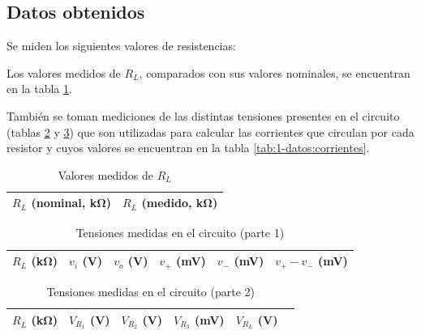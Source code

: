 \subsection{Datos obtenidos}

Se miden los siguientes valores de resistencias:

\begin{itemize}
        
\end{itemize}

Los valores medidos de $R_L$, comparados con sus valores nominales, se encuentran en la tabla \ref{tab:1-datos:resistencias-l}.

También se toman mediciones de las distintas tensiones presentes en el circuito (tablas \ref{tab:1-datos:tensiones-1} y \ref{tab:1-datos:tensiones-2}) que son utilizadas para calcular las corrientes que circulan por cada resistor y cuyos valores se encuentran en la tabla \ref{tab:1-datos:corrientes}.

\begin{table}[H]
    \centering
    \begin{tabular}{@{}rr@{}}
        \toprule
        $R_L$ (nominal, \si{\kilo\ohm}) & $R_L$ (medido, \si{\kilo\ohm})  \\
        \midrule
        
    \end{tabular}
    \caption{Valores medidos de $R_L$}
    \label{tab:1-datos:resistencias-l}
\end{table}

\begin{table}[H]
    \centering
    \begin{tabular}{@{}rrrrrr@{}}
        \toprule
        $R_L$ (\si{\kilo\ohm}) & $v_i$ (\si{\volt}) & $v_o$ (\si{\volt}) & 
            $v_+$ (\si{\milli\volt}) & $v_-$ (\si{\milli\volt}) &
            $v_+ - v_-$ (\si{\milli\volt}) \\
        \midrule
        
    \end{tabular}
    \caption{Tensiones medidas en el circuito (parte 1)}
    \label{tab:1-datos:tensiones-1}
\end{table}

\begin{table}[H]
    \centering
    \begin{tabular}{@{}rrrrrr@{}}
        \toprule
        $R_L$ (\si{\kilo\ohm}) & $V_{R_1}$ (\si{\volt}) & $V_{R_2}$ (\si{\volt})& $V_{R_3}$ (\si{\milli\volt}) & $V_{R_L}$ (\si{\volt}) \\
        \midrule
        
    \end{tabular}
    \caption{Tensiones medidas en el circuito (parte 2)}
    \label{tab:1-datos:tensiones-2}
\end{table}

